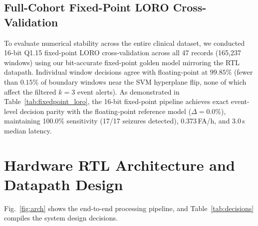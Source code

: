 \documentclass[10pt,twocolumn,letterpaper]{article}
\begin{document}
{\color{blue}
\subsection{Full-Cohort Fixed-Point LORO Cross-Validation}
\label{sec:fixedpoint_loro}

To evaluate numerical stability across the entire clinical dataset, we conducted 16-bit Q1.15 fixed-point LORO cross-validation across all 47 records (165,237 windows) using our bit-accurate fixed-point golden model mirroring the RTL datapath. Individual window decisions agree with floating-point at $99.85\%$ (fewer than $0.15\%$ of boundary windows near the SVM hyperplane flip, none of which affect the filtered $k=3$ event alerts). As demonstrated in Table~\ref{tab:fixedpoint_loro}, the 16-bit fixed-point pipeline achieves exact event-level decision parity with the floating-point reference model ($\Delta = 0.0\%$), maintaining 100.0\% sensitivity (17/17 seizures detected), 0.373\,FA/h, and 3.0\,s median latency.

\begin{table}[t]
\centering
\footnotesize
\color{blue}
\caption{\textcolor{blue}{Full-cohort LORO cross-validation: Floating-point Python vs.\ 16-bit Q1.15 fixed-point model across all 47 records.}}
\label{tab:fixedpoint_loro}
\end{table}
}

\section{Hardware RTL Architecture and Datapath Design}
\label{sec:rtl_arch}

Fig.~\ref{fig:arch} shows the end-to-end processing pipeline, and Table~\ref{tab:decisions} compiles the system design decisions.
\end{document}
